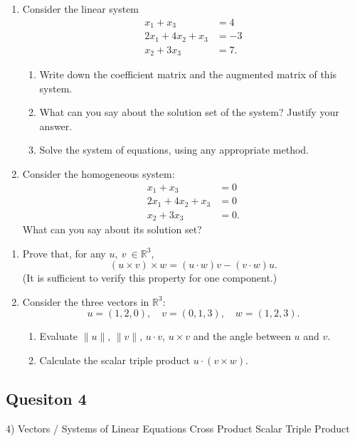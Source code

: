 \documentclass[12pt,a4paper]{article}
\def\marks#1{\hfill\rlap{~~~~~~~~~~~#1}}
\begin{document}
\begin{enumerate}
	\item Consider the linear system
	\begin{align*}
	x_1 + x_3 &= 4\\
	2x_1 + 4x_2 + x_3 &= -3\\
	x_2 + 3x_3 &= 7.
	\end{align*}
	\begin{enumerate}
		\item Write down the coefficient matrix and the augmented matrix of this system. \marks{4}
		
		\item What can you say about the solution set of the system? Justify your answer. \marks{4}
		
		\item Solve the system of equations, using any appropriate method. \marks{6}
	\end{enumerate}
	\item Consider the homogeneous system:
	\begin{align*}
	x_1 + x_3 &= 0\\
	2x_1 + 4x_2 + x_3 &= 0\\
	x_2 + 3x_3 &= 0.
	\end{align*}
	What can you say about its solution set?\marks{4}
\end{enumerate}
\vfill
\item %
\begin{enumerate}
	\item Prove that, for any $u,\:v\:\in\mathbb{R}^3$, \marks{8}
	$$(u\times v)\times w= (u\cdot w)v - (v\cdot w)u.$$
	(It is sufficient to verify this property for one component.)
	\item\vfill
	Consider the three vectors in $\mathbb{R}^3$:
	$$
	u = (1, 2, 0), \quad v = (0, 1, 3),\quad w = (1, 2, 3).
	$$
	\begin{enumerate}
		\item  Evaluate $\|u\|$, $\|v\|$, $u\cdot v$, $u\times v$ and the angle between $u$ and $v$. \marks{3}
		
		\medskip\item Calculate the scalar triple product  $u\cdot(v \times w)$.\marks{3}
	\end{enumerate}\vfill
\end{enumerate}
\subsection*{Quesiton 4}
4) Vectors / Systems of Linear Equations
	Cross Product
	Scalar Triple Product
\end{document}
